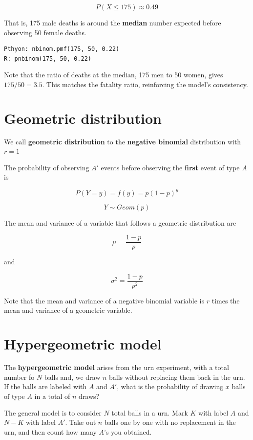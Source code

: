 \documentclass[
]{book}
\begin{document}
\[
P(X \leq 175) \approx 0.49
\]

That is, 175 male deaths is around the \textbf{median} number expected before observing 50 female deaths.

\begin{verbatim}
Pthyon: nbinom.pmf(175, 50, 0.22)
R: pnbinom(175, 50, 0.22)
\end{verbatim}

Note that the ratio of deaths at the median, 175 men to 50 women, gives \(175/50=3.5\). This matches the fatality ratio, reinforcing the model's consistency.

\hypertarget{geometric-distribution}{%
\section{Geometric distribution}\label{geometric-distribution}}

We call \textbf{geometric distribution} to the \textbf{negative binomial} distribution with \(r=1\)

The probability of observing \(A'\) events before observing the \textbf{first} event of type \(A\) is

\[P(Y=y)=f(y)= p(1-p)^y\]

\[Y\sim Geom(p)\]

The mean and variance of a variable that follows a geometric distribution are

\[\mu= \frac{1-p}{p}\]

and

\[\sigma^2= \frac{1-p}{p^2}\]

Note that the mean and variance of a negative binomial variable is \(r\) times the mean and variance of a geometric variable.

\hypertarget{hypergeometric-model}{%
\section{Hypergeometric model}\label{hypergeometric-model}}

The \textbf{hypergeometric model} arises from the urn experiment, with a total number fo \(N\) balls and, we draw \(n\) balls without replacing them back in the urn. If the balls are labeled with \(A\) and \(A'\), what is the probability of drawing \(x\) balls of type \(A\) in a total of \(n\) draws?

The general model is to consider \(N\) total balls in a urn. Mark \(K\) with label \(A\) and \(N-K\) with label \(A'\). Take out \(n\) balls one by one with no replacement in the urn, and then count how many \(A\)'s you obtained.
\end{document}
